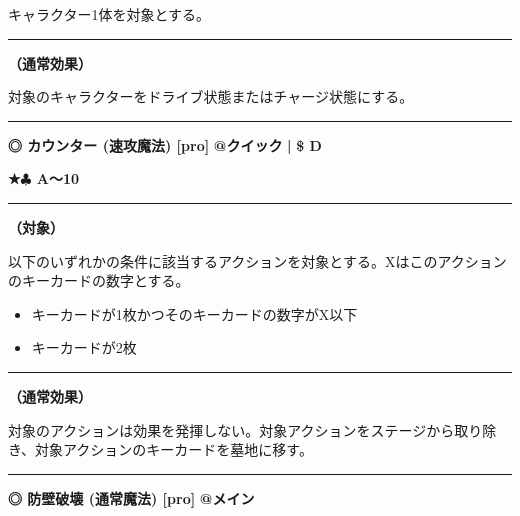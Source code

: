 \documentclass[twocolumn,a5paper,papersize,10pt]{jarticle}
\begin{document}
キャラクター1体を対象とする。
\vspace{1mm}%
\hrule height 0.1mm depth 0mm width 66.5mm %
\vspace{1mm}%

{\bf（通常効果）}

対象のキャラクターをドライブ状態またはチャージ状態にする。
\vspace{2mm} %
\hrule height 0.5mm depth 0mm width 66.5mm %
\vspace{1mm} %
{\small\bf ◎ カウンター {\scriptsize (速攻魔法) [pro]}} %
\hfill 
{\footnotesize\bf @クイック }
  {\footnotesize\bf | } {\footnotesize\bf \$ D}

{\footnotesize\bf ★{\normalsize $\clubsuit$} A〜10}

\vspace{1mm}%
\hrule height 0.1mm depth 0mm width 66.5mm %
\vspace{1mm}%
{\bf（対象）}

以下のいずれかの条件に該当するアクションを対象とする。Xはこのアクションのキーカードの数字とする。


\vspace{-1zh}%
\begin{itemize}
\setlength{\leftskip}{-0.3cm}
\setlength{\parskip}{0pt} %

\item キーカードが1枚かつそのキーカードの数字がX以下

\item キーカードが2枚
\vspace{-1zh}%
\end{itemize}
\vspace{1mm}%
\hrule height 0.1mm depth 0mm width 66.5mm %
\vspace{1mm}%

{\bf（通常効果）}

対象のアクションは効果を発揮しない。対象アクションをステージから取り除き、対象アクションのキーカードを墓地に移す。
\vspace{2mm} %
\hrule height 0.5mm depth 0mm width 66.5mm %
\vspace{1mm} %
{\small\bf ◎ 防壁破壊 {\scriptsize (通常魔法) [pro]}} %
\hfill 
{\footnotesize\bf @メイン }
\end{document}
